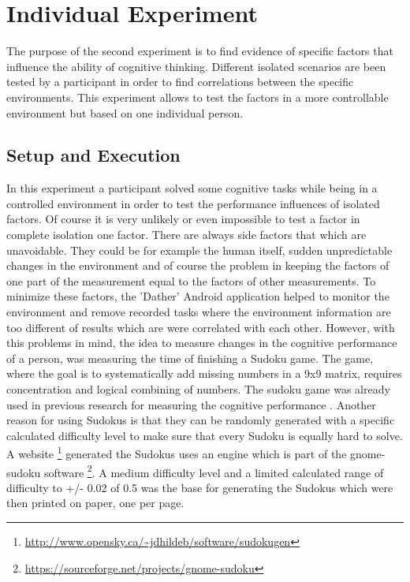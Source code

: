 { 
\section{Individual Experiment}
The purpose of the second experiment is to find evidence of specific factors that influence the ability of cognitive thinking. Different isolated scenarios are been tested by a participant in order to find correlations between the specific environments. 
This experiment allows to test the factors in a more controllable environment but based on one individual person. 

\subsection{Setup and Execution}
In this experiment a participant solved some cognitive tasks while being in a controlled environment in order to test the performance influences of isolated factors. 
Of course it is very unlikely or even impossible to test a factor in complete isolation one factor. There are always side factors that which are unavoidable. They could be for example the human itself, sudden unpredictable changes in the environment and of course the problem in keeping the factors of one part of the measurement equal to the factors of other measurements. 
To minimize these factors, the 'Dather' Android application helped to monitor the environment and remove recorded tasks where the environment information are too different of results which are were correlated with each other. 
However, with this problems in mind, the idea to measure changes in the cognitive performance of a person, was measuring the time of finishing a Sudoku game. 
The game, where the goal is to systematically add missing numbers in a 9x9 matrix, requires concentration and logical combining of numbers. 
The sudoku game was already used in previous research for measuring the cognitive performance \cite{sobolewski2009monitoring} \cite{xiang2009using}. 
Another reason for using Sudokus is that they can be randomly generated with a specific calculated difficulty level to make sure that every Sudoku is equally hard to solve. 
A website \footnote{\url{http://www.opensky.ca/~jdhildeb/software/sudokugen}} generated the Sudokus uses an engine which is part of the gnome-sudoku software \footnote{\url{https://sourceforge.net/projects/gnome-sudoku}}. 
A medium difficulty level and a limited calculated range of difficulty to +/- 0.02 of 0.5 was the base for generating the Sudokus which were then printed on paper, one per page. 

}

